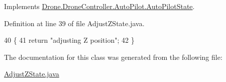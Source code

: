 Implements \hyperlink{interface_drone_1_1_drone_controller_1_1_auto_pilot_1_1_auto_pilot_state_ac30fcebfe95c80d2d66d44dc7d46ebc3}{Drone.\+Drone\+Controller.\+Auto\+Pilot.\+Auto\+Pilot\+State}.



Definition at line 39 of file Adjust\+Z\+State.\+java.


\begin{DoxyCode}
40     \{
41         \textcolor{keywordflow}{return} \textcolor{stringliteral}{"adjusting Z position"};
42     \}
\end{DoxyCode}


The documentation for this class was generated from the following file\+:\begin{DoxyCompactItemize}
\item 
\hyperlink{_adjust_z_state_8java}{Adjust\+Z\+State.\+java}\end{DoxyCompactItemize}
